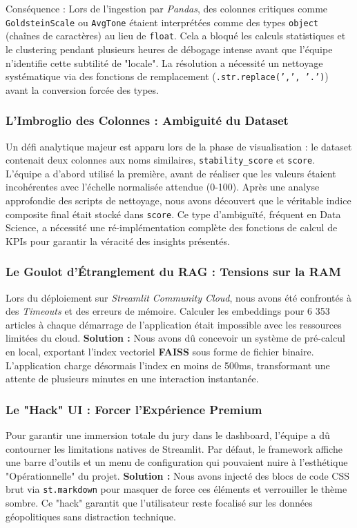 \documentclass[12pt,a4paper]{article}
\begin{document}
Conséquence : Lors de l'ingestion par \textit{Pandas}, des colonnes critiques comme \texttt{GoldsteinScale} ou \texttt{AvgTone} étaient interprétées comme des types \texttt{object} (chaînes de caractères) au lieu de \texttt{float}. Cela a bloqué les calculs statistiques et le clustering pendant plusieurs heures de débogage intense avant que l'équipe n'identifie cette subtilité de "locale". La résolution a nécessité un nettoyage systématique via des fonctions de remplacement (\texttt{.str.replace(',', '.')}) avant la conversion forcée des types.

\subsubsection{L'Imbroglio des Colonnes : Ambiguité du Dataset}
Un défi analytique majeur est apparu lors de la phase de visualisation : le dataset contenait deux colonnes aux noms similaires, \texttt{stability\_score} et \texttt{score}. L'équipe a d'abord utilisé la première, avant de réaliser que les valeurs étaient incohérentes avec l'échelle normalisée attendue (0-100). Après une analyse approfondie des scripts de nettoyage, nous avons découvert que le véritable indice composite final était stocké dans \texttt{score}. Ce type d'ambiguïté, fréquent en Data Science, a nécessité une ré-implémentation complète des fonctions de calcul de KPIs pour garantir la véracité des insights présentés.

\subsubsection{Le Goulot d'Étranglement du RAG : Tensions sur la RAM}
Lors du déploiement sur \textit{Streamlit Community Cloud}, nous avons été confrontés à des \textit{Timeouts} et des erreurs de mémoire. Calculer les embeddings pour 6 353 articles à chaque démarrage de l'application était impossible avec les ressources limitées du cloud. 
\textbf{Solution :} Nous avons dû concevoir un système de pré-calcul en local, exportant l'index vectoriel \textbf{FAISS} sous forme de fichier binaire. L'application charge désormais l'index en moins de 500ms, transformant une attente de plusieurs minutes en une interaction instantanée.

\subsubsection{Le "Hack" UI : Forcer l'Expérience Premium}
Pour garantir une immersion totale du jury dans le dashboard, l'équipe a dû contourner les limitations natives de Streamlit. Par défaut, le framework affiche une barre d'outils et un menu de configuration qui pouvaient nuire à l'esthétique "Opérationnelle" du projet. 
\textbf{Solution :} Nous avons injecté des blocs de code CSS brut via \texttt{st.markdown} pour masquer de force ces éléments et verrouiller le thème sombre. Ce "hack" garantit que l'utilisateur reste focalisé sur les données géopolitiques sans distraction technique.
\end{document}
